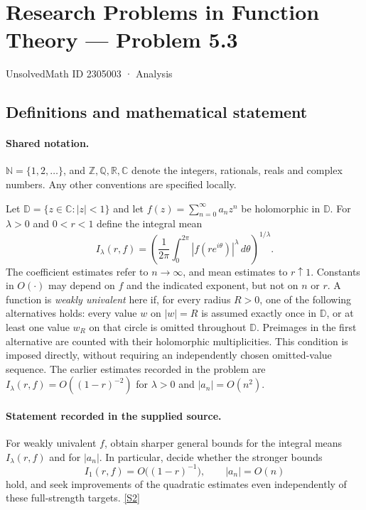 \documentclass[11pt]{book}
\newcommand{\sref}[2]{\hyperlink{source:#1:#2}{[S#2]}}
\begin{document}
\setcounter{section}{2305002}
\section{Research Problems in Function Theory — Problem 5.3}\label{2305003}
{\small\sffamily UnsolvedMath ID 2305003 · Analysis}
\subsection{Definitions and mathematical statement}

\paragraph{Shared notation.}$\mathbb N=\{1,2,\ldots\}$, and $\mathbb Z,\mathbb Q,\mathbb R,\mathbb C$ denote the integers, rationals, reals and complex numbers. Any other conventions are specified locally.


Let $\mathbb D=\{z\in\mathbb C:|z|<1\}$ and let $f(z)=\sum_{n=0}^\infty a_nz^n$ be holomorphic in $\mathbb D$. For $\lambda>0$ and $0<r<1$ define the integral mean
\[I_\lambda(r,f)=\left(\frac1{2\pi}\int_0^{2\pi}|f(re^{i\theta})|^\lambda\,d\theta\right)^{1/\lambda}.
\]
The coefficient estimates refer to $n\to\infty$, and mean estimates to $r\uparrow1$. Constants in $O(\cdot)$ may depend on $f$ and the indicated exponent, but not on $n$ or $r$. A function is \emph{weakly univalent} here if, for every radius $R>0$, one of the following alternatives holds: every value $w$ on $|w|=R$ is assumed exactly once in $\mathbb D$, or at least one value $w_R$ on that circle is omitted throughout $\mathbb D$. Preimages in the first alternative are counted with their holomorphic multiplicities. This condition is imposed directly, without requiring an independently chosen omitted-value sequence.
The earlier estimates recorded in the problem are $I_\lambda(r,f)=O((1-r)^{-2})$ for $\lambda>0$ and $|a_n|=O(n^2)$.
\paragraph{Statement recorded in the supplied source.}
For weakly univalent $f$, obtain sharper general bounds for the integral means $I_\lambda(r,f)$ and for $|a_n|$. In particular, decide whether the stronger bounds
\[I_1(r,f)=O\bigl((1-r)^{-1}\bigr),\qquad |a_n|=O(n)
\]
hold, and seek improvements of the quadratic estimates even independently of these full-strength targets. \sref{2305003}{2}
\end{document}

